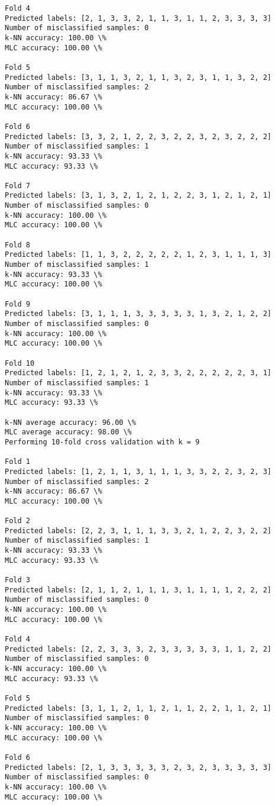\documentclass[11pt]{article}
\begin{document}
\begin{Verbatim}[commandchars=\\\{\}]
Fold 4
Predicted labels: [2, 1, 3, 3, 2, 1, 1, 3, 1, 1, 2, 3, 3, 3, 3]
Number of misclassified samples: 0
k-NN accuracy: 100.00 \%
MLC accuracy: 100.00 \%

Fold 5
Predicted labels: [3, 1, 1, 3, 2, 1, 1, 3, 2, 3, 1, 1, 3, 2, 2]
Number of misclassified samples: 2
k-NN accuracy: 86.67 \%
MLC accuracy: 100.00 \%

Fold 6
Predicted labels: [3, 3, 2, 1, 2, 2, 3, 2, 2, 3, 2, 3, 2, 2, 2]
Number of misclassified samples: 1
k-NN accuracy: 93.33 \%
MLC accuracy: 93.33 \%

Fold 7
Predicted labels: [3, 1, 3, 2, 1, 2, 1, 2, 2, 3, 1, 2, 1, 2, 1]
Number of misclassified samples: 0
k-NN accuracy: 100.00 \%
MLC accuracy: 100.00 \%

Fold 8
Predicted labels: [1, 1, 3, 2, 2, 2, 2, 2, 1, 2, 3, 1, 1, 1, 3]
Number of misclassified samples: 1
k-NN accuracy: 93.33 \%
MLC accuracy: 100.00 \%

Fold 9
Predicted labels: [3, 1, 1, 1, 3, 3, 3, 3, 3, 1, 3, 2, 1, 2, 2]
Number of misclassified samples: 0
k-NN accuracy: 100.00 \%
MLC accuracy: 100.00 \%

Fold 10
Predicted labels: [1, 2, 1, 2, 1, 2, 3, 3, 2, 2, 2, 2, 2, 3, 1]
Number of misclassified samples: 1
k-NN accuracy: 93.33 \%
MLC accuracy: 93.33 \%

k-NN average accuracy: 96.00 \%
MLC average accuracy: 98.00 \%
Performing 10-fold cross validation with k = 9

Fold 1
Predicted labels: [1, 2, 1, 1, 3, 1, 1, 1, 3, 3, 2, 2, 3, 2, 3]
Number of misclassified samples: 2
k-NN accuracy: 86.67 \%
MLC accuracy: 100.00 \%

Fold 2
Predicted labels: [2, 2, 3, 1, 1, 1, 3, 3, 2, 1, 2, 2, 3, 2, 2]
Number of misclassified samples: 1
k-NN accuracy: 93.33 \%
MLC accuracy: 93.33 \%

Fold 3
Predicted labels: [2, 1, 1, 2, 1, 1, 1, 3, 1, 1, 1, 1, 2, 2, 2]
Number of misclassified samples: 0
k-NN accuracy: 100.00 \%
MLC accuracy: 100.00 \%

Fold 4
Predicted labels: [2, 2, 3, 3, 3, 2, 3, 3, 3, 3, 3, 1, 1, 2, 2]
Number of misclassified samples: 0
k-NN accuracy: 100.00 \%
MLC accuracy: 93.33 \%

Fold 5
Predicted labels: [3, 1, 1, 2, 1, 1, 2, 1, 1, 2, 2, 1, 1, 2, 1]
Number of misclassified samples: 0
k-NN accuracy: 100.00 \%
MLC accuracy: 100.00 \%

Fold 6
Predicted labels: [2, 1, 3, 3, 3, 3, 3, 2, 3, 2, 3, 3, 3, 3, 3]
Number of misclassified samples: 0
k-NN accuracy: 100.00 \%
MLC accuracy: 100.00 \%


\end{Verbatim}
\end{document}
